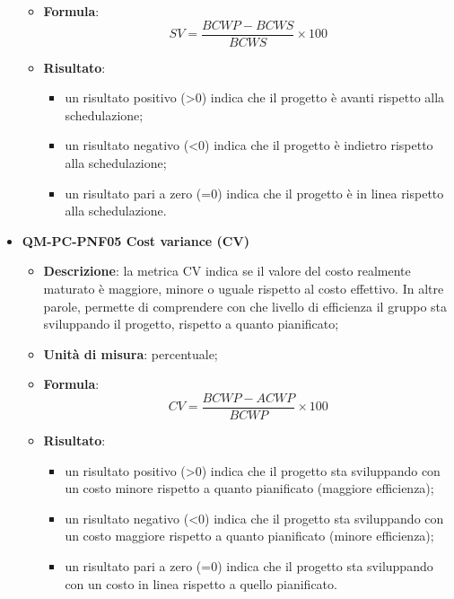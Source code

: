 \begin{itemize}
\begin{itemize}
							\item\textbf{Formula}: \\
								\[SV = \frac{\mathit{BCWP} - \mathit{BCWS}}{\mathit{BCWS}} \times 100\]
							\item\textbf{Risultato}:
								\begin{itemize}
									\item un risultato positivo (>0) indica che il progetto è avanti rispetto alla schedulazione;
									\item un risultato negativo (<0) indica che il progetto è indietro rispetto alla schedulazione;
									\item un risultato pari a zero (=0) indica che il progetto è in linea rispetto alla schedulazione.
								\end{itemize}
						\end{itemize}
					\item\textbf{QM-PC-PNF05 Cost variance (CV)}
						\begin{itemize}
							\item\textbf{Descrizione}: la metrica CV indica se il valore del costo realmente maturato è maggiore, minore o uguale rispetto al costo effettivo. In altre parole, permette di comprendere con che livello di efficienza il gruppo sta sviluppando il progetto, rispetto a quanto pianificato;
							\item\textbf{Unità di misura}: percentuale;
							\item\textbf{Formula}: \\
								\[CV = \frac{\mathit{BCWP} - \mathit{ACWP}}{\mathit{BCWP}} \times 100\]
							\item\textbf{Risultato}:
								\begin{itemize}
									\item un risultato positivo (>0) indica che il progetto sta sviluppando con un costo minore rispetto a quanto pianificato (maggiore efficienza);
									\item un risultato negativo (<0) indica che il progetto sta sviluppando con un costo maggiore rispetto a quanto pianificato (minore efficienza);
									\item un risultato pari a zero (=0) indica che il progetto sta sviluppando con un costo in linea rispetto a quello pianificato.
								\end{itemize}
						\end{itemize}
				\end{itemize}
